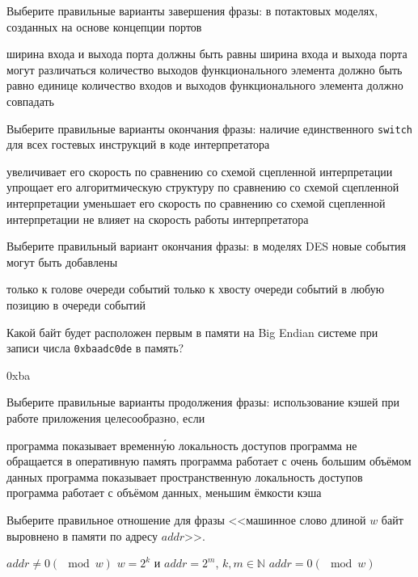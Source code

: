 \documentclass[a4paper, addpoints]{exam}
\begin{document}
\begin{questions}
\question[1] Выберите правильные варианты завершения фразы: в потактовых моделях, созданных на основе концепции портов
\begin{choices}
    \correctchoice ширина входа и выхода порта должны быть равны
    \choice ширина входа и выхода порта могут различаться
    \choice количество выходов функционального элемента должно быть равно единице
    \choice количество входов и выходов функционального элемента должно совпадать
\end{choices}
    
\question[1] Выберите правильные варианты окончания фразы: наличие единственного \texttt{switch} для всех гостевых инструкций в коде интерпретатора
\begin{choices}
    \choice увеличивает его скорость по сравнению со схемой сцепленной интерпретации
    \choice упрощает его алгоритмическую структуру по сравнению со схемой сцепленной интерпретации
    \correctchoice уменьшает его скорость по сравнению со схемой сцепленной интерпретации
    \choice не влияет на скорость работы интерпретатора
\end{choices}

\question[1] Выберите правильный вариант окончания фразы: в моделях DES новые события могут быть добавлены
\begin{choices}
    \choice только к голове очереди событий
    \choice только к хвосту очереди событий
    \correctchoice в любую позицию в очереди событий
\end{choices}

\question[1] Какой байт будет расположен первым в памяти на Big Endian системе при записи числа \texttt{0xbaadc0de} в память?
\begin{solution}[1cm]
0xba
\end{solution}

\question[1] Выберите правильные варианты продолжения фразы: использование кэшей при работе приложения целесообразно, если
\begin{choices}
    \correctchoice    программа показывает временн\'{у}ю локальность доступов
    \choice программа не обращается в оперативную память
    \choice программа работает с очень большим объёмом данных
    \correctchoice программа показывает пространственную локальность доступов
    \choice программа работает с объёмом данных, меньшим ёмкости кэша
\end{choices}

\question[1] Выберите правильное отношение для фразы <<машинное слово длиной $w$ байт выровнено в памяти по адресу $addr$>>.
\begin{choices}
	\choice $addr \neq 0 (\mod w)$
	\choice $w = 2^k$ и $addr = 2^m$, $k,m \in \mathbb{N}$
    \correctchoice $addr = 0 (\mod w)$
\end{choices}


\end{questions}
\end{document}
